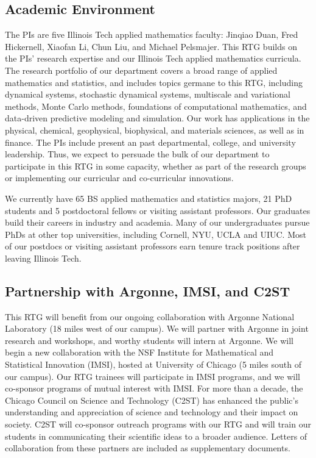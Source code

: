 \documentclass[11pt]{NSFamsart}
\newcommand{\numUG}{65\xspace}
\newcommand{\numPhD}{21\xspace}
\newcommand{\numPostDoc}{5\xspace}
\begin{document}
\subsection*{Academic Environment} The PIs are five Illinois Tech applied mathematics faculty:  Jinqiao Duan, Fred Hickernell, Xiaofan Li, Chun Liu, and Michael Pelsmajer. This RTG builds on the PIs' research expertise and our Illinois Tech applied mathematics curricula.  The research portfolio of our department covers a broad range of applied mathematics and statistics, and includes topics germane to this RTG, including dynamical systems, stochastic dynamical systems, multiscale and variational methods,  Monte Carlo methods, foundations of computational mathematics, and data-driven predictive modeling and simulation. Our work has applications in the physical, chemical, geophysical, biophysical, and materials sciences, as well as in finance. The PIs include present an past departmental, college, and university leadership.  Thus, we expect to persuade the bulk of our department to participate in this RTG in some capacity, whether as part of the research groups or implementing our curricular and co-curricular innovations.

We currently have \numUG BS applied mathematics and statistics majors, \numPhD PhD students and   \numPostDoc postdoctoral fellows or visiting assistant professors. Our graduates build their careers in  industry  and academia. Many of our undergraduates pursue PhDs at other top universities, including Cornell, NYU, UCLA and UIUC. Most of our postdocs or visiting assistant professors earn tenure track positions after leaving Illinois Tech.

\subsection*{Partnership with Argonne, IMSI, and C2ST}
This RTG will benefit from our ongoing collaboration with Argonne National Laboratory (18 miles west of our campus). We will partner with Argonne in joint research and workshops, and worthy students will intern at Argonne.  We will begin a new collaboration with the NSF Institute for Mathematical and Statistical Innovation (IMSI), hosted at University of Chicago (5 miles south of our campus). Our RTG trainees will participate in IMSI programs, and we will co-sponsor programs of mutual interest with IMSI.  For more than a decade, the Chicago Council on Science and Technology (C2ST) has enhanced the public’s understanding and appreciation of science and technology and their impact on society. C2ST will co-sponsor outreach programs with our RTG and will train our students in communicating their scientific ideas to a broader audience. Letters of collaboration from these partners are included as supplementary documents.
 
\end{document}
